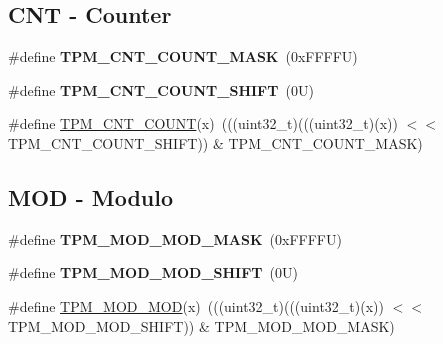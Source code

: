 \subsection*{C\+NT -\/ Counter}
\begin{DoxyCompactItemize}
\item 
\mbox{\label{group___t_p_m___register___masks_gae4ca4e3ce211106290e584675dab1d28}} 
\#define {\bfseries T\+P\+M\+\_\+\+C\+N\+T\+\_\+\+C\+O\+U\+N\+T\+\_\+\+M\+A\+SK}~(0x\+F\+F\+F\+F\+U)
\item 
\mbox{\label{group___t_p_m___register___masks_gabc68cb7f4dfd853021c35f9cad5b05e2}} 
\#define {\bfseries T\+P\+M\+\_\+\+C\+N\+T\+\_\+\+C\+O\+U\+N\+T\+\_\+\+S\+H\+I\+FT}~(0\+U)
\item 
\#define \mbox{\hyperlink{group___t_p_m___register___masks_ga5b121b9bc3cc5527202fc0e64eae37fd}{T\+P\+M\+\_\+\+C\+N\+T\+\_\+\+C\+O\+U\+NT}}(x)~(((uint32\+\_\+t)(((uint32\+\_\+t)(x)) $<$$<$ T\+P\+M\+\_\+\+C\+N\+T\+\_\+\+C\+O\+U\+N\+T\+\_\+\+S\+H\+I\+FT)) \& T\+P\+M\+\_\+\+C\+N\+T\+\_\+\+C\+O\+U\+N\+T\+\_\+\+M\+A\+SK)
\end{DoxyCompactItemize}
\subsection*{M\+OD -\/ Modulo}
\begin{DoxyCompactItemize}
\item 
\mbox{\label{group___t_p_m___register___masks_ga547f0f1f80a59cf7a5c19b6e5ee66055}} 
\#define {\bfseries T\+P\+M\+\_\+\+M\+O\+D\+\_\+\+M\+O\+D\+\_\+\+M\+A\+SK}~(0x\+F\+F\+F\+F\+U)
\item 
\mbox{\label{group___t_p_m___register___masks_gad3b8c1cb94d29448d0eef30e94d65299}} 
\#define {\bfseries T\+P\+M\+\_\+\+M\+O\+D\+\_\+\+M\+O\+D\+\_\+\+S\+H\+I\+FT}~(0\+U)
\item 
\#define \mbox{\hyperlink{group___t_p_m___register___masks_ga5bbadc84c3e752cd934747b91cdaf426}{T\+P\+M\+\_\+\+M\+O\+D\+\_\+\+M\+OD}}(x)~(((uint32\+\_\+t)(((uint32\+\_\+t)(x)) $<$$<$ T\+P\+M\+\_\+\+M\+O\+D\+\_\+\+M\+O\+D\+\_\+\+S\+H\+I\+FT)) \& T\+P\+M\+\_\+\+M\+O\+D\+\_\+\+M\+O\+D\+\_\+\+M\+A\+SK)
\end{DoxyCompactItemize}
